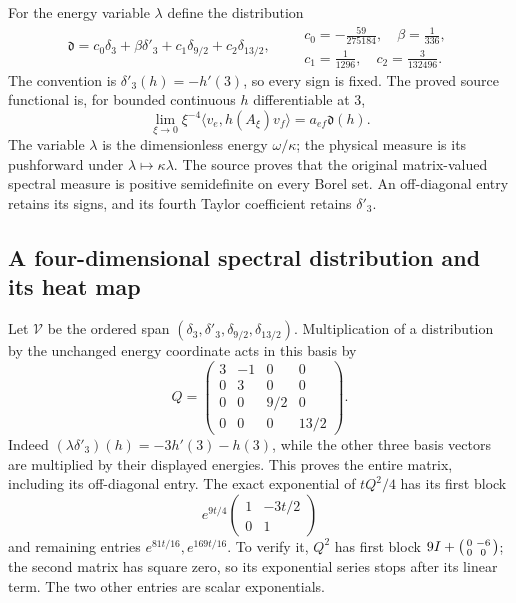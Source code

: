 For the energy variable $\lambda$ define the distribution
\begin{equation}
\mathfrak d=c_0\delta_3+\beta\delta'_3+
                  c_1\delta_{9/2}+c_2\delta_{13/2},\qquad
\begin{gathered}
c_0=-\frac{59}{275184},\quad\beta=\frac1{336},\\
c_1=\frac1{1296},\quad c_2=\frac3{132496}.
\end{gathered}
\label{x4:distribution}
\end{equation}
The convention is $\delta'_3(h)=-h'(3)$, so every sign is fixed.
The proved source functional is, for bounded continuous $h$ differentiable
at $3$,
\begin{equation}
\lim_{\xi\to0}\xi^{-4}\langle v_e,h(A_\xi)v_f\rangle
                       =a_{ef}\mathfrak d(h).
\label{x4:source-functional}
\end{equation}
The variable $\lambda$ is the dimensionless energy $\omega/\kappa$;
the physical measure is its pushforward under $\lambda\mapsto\kappa\lambda$.
The source proves that the original matrix-valued spectral measure is
positive semidefinite on every Borel set. An off-diagonal entry retains
its signs, and its fourth Taylor coefficient retains $\delta'_3$.

\subsection{A four-dimensional spectral distribution and its heat map}

Let $\mathcal V$ be the ordered span
$(\delta_3,\delta'_3,\delta_{9/2},\delta_{13/2})$.
Multiplication of a distribution by the unchanged energy coordinate
acts in this basis by
\begin{equation}
Q=\begin{pmatrix}
3&-1&0&0\\0&3&0&0\\0&0&9/2&0\\0&0&0&13/2
\end{pmatrix}.
\label{x4:energy-matrix}
\end{equation}
Indeed $(\lambda\delta'_3)(h)=-3h'(3)-h(3)$, while the other
three basis vectors are multiplied by their displayed energies. This
proves the entire matrix, including its off-diagonal entry. The exact
exponential of $tQ^2/4$ has its first block
\[
e^{9t/4}\begin{pmatrix}1&-3t/2\\0&1\end{pmatrix}
\]
and remaining entries $e^{81t/16},e^{169t/16}$. To verify it,
$Q^2$ has first block $9I+\begin{psmallmatrix}0&-6\\0&0\end{psmallmatrix}$;
the second matrix has square zero, so its exponential series stops after
its linear term. The two other entries are scalar exponentials.

